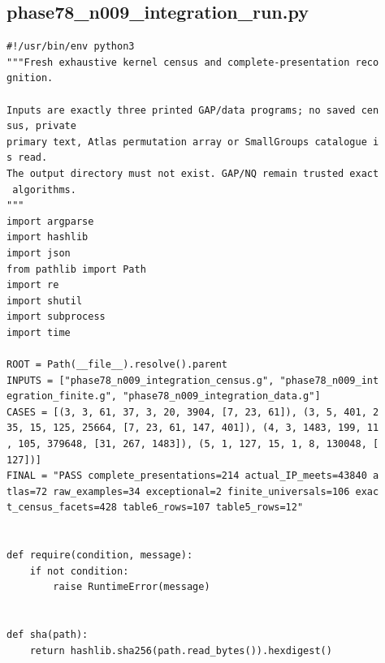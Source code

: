 \documentclass[
  11pt,
  a4paper,
]{article}
\begin{document}
\subsection{phase78\_n009\_integration\_run.py}\label{phase78_n009_integration_run.py}

\begin{verbatim}
#!/usr/bin/env python3
"""Fresh exhaustive kernel census and complete-presentation reco
gnition.

Inputs are exactly three printed GAP/data programs; no saved cen
sus, private
primary text, Atlas permutation array or SmallGroups catalogue i
s read.
The output directory must not exist. GAP/NQ remain trusted exact
 algorithms.
"""
import argparse
import hashlib
import json
from pathlib import Path
import re
import shutil
import subprocess
import time

ROOT = Path(__file__).resolve().parent
INPUTS = ["phase78_n009_integration_census.g", "phase78_n009_int
egration_finite.g", "phase78_n009_integration_data.g"]
CASES = [(3, 3, 61, 37, 3, 20, 3904, [7, 23, 61]), (3, 5, 401, 2
35, 15, 125, 25664, [7, 23, 61, 147, 401]), (4, 3, 1483, 199, 11
, 105, 379648, [31, 267, 1483]), (5, 1, 127, 15, 1, 8, 130048, [
127])]
FINAL = "PASS complete_presentations=214 actual_IP_meets=43840 a
tlas=72 raw_examples=34 exceptional=2 finite_universals=106 exac
t_census_facets=428 table6_rows=107 table5_rows=12"


def require(condition, message):
    if not condition:
        raise RuntimeError(message)


def sha(path):
    return hashlib.sha256(path.read_bytes()).hexdigest()



\end{verbatim}
\end{document}
